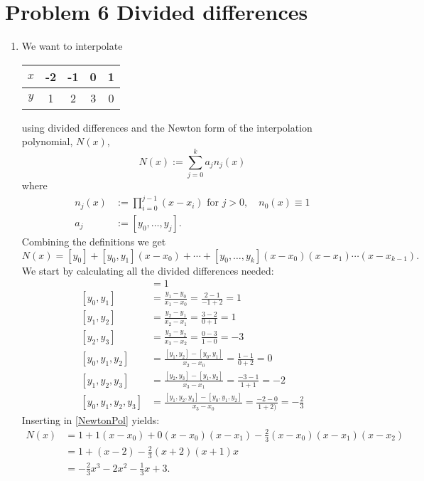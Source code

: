 \section{Problem 6 Divided differences}
\begin{enumerate}[ a)]
  \item
We want to interpolate
\begin{tabular}{c|cccc}
  \(x\) & -2 & -1 & 0 & 1 \\
  \hline\(y\) & 1 & 2 & 3 & 0
\end{tabular}
using divided differences and the Newton form of the interpolation polynomial, $N(x)$,
  \begin{equation}\label{Newton} N(x):= \sum_{j=0}^k a_jn_j(x) \end{equation}
where
\begin{align}
   n_j(x) & := \prod_{i=0}^{j-1}(x-x_i) \text{ for } j>0, \quad n_0(x)\equiv 1 \\
   a_j & := [y_0,\dots,y_j].
\end{align}
Combining the definitions we get
\begin{equation}\label{NewtonPol}
  N(x)=[y_0]+[y_0,y_1](x-x_0)+\cdots+ [y_0,\dots,y_k](x-x_0)(x-x_1)\cdots(x-x_{k-1}).
\end{equation}
We start by calculating all the divided differences needed:
\begin{align*}
    [y_0] &=1 \\
    [y_0,y_1] &= \frac{y_1-y_0}{x_1-x_0} = \frac{2-1}{-1+2} = 1 \\
    [y_1,y_2] &= \frac{y_2-y_1}{x_2-x_1} = \frac{3-2}{0+1} = 1 \\
    [y_2,y_3] &= \frac{y_3-y_2}{x_3-x_2}=\frac{0-3}{1-0} = -3 \\
    [y_0,y_1,y_2] &= \frac{[y_1,y_2]-[y_0,y_1]}{x_2-x_0} = \frac{1-1}{0+2}=0 \\
    [y_1,y_2,y_3] &= \frac{[y_2,y_3]-[y_1,y_2]}{x_3-x_1} = \frac{-3-1}{1+1}=-2 \\
    [y_0,y_1,y_2,y_3] &= \frac{[y_1,y_2,y_3]-[y_0,y_1,y_2]}{x_3-x_0} = \frac{-2-0}{1+2)} = -\frac{2}{3}
\end{align*}
Inserting in \ref{NewtonPol} yields:
\begin{align*}
   N(x) & =1+1(x-x_0)+0(x-x_0)(x-x_1)-\frac{2}{3}(x-x_0)(x-x_1)(x-x_2) \\
   & = 1+(x-2)-\frac{2}{3}(x+2)(x+1)x \\
   & = -\frac{2}{3}x^3-2x^2-\frac{1}{3}x+3.
\end{align*}


\end{enumerate}
